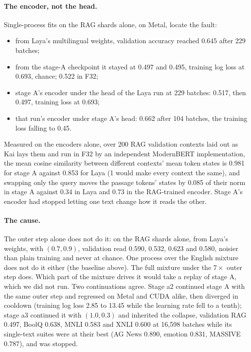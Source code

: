 \paragraph{The encoder, not the head.}
Single-process fits on the RAG shards alone, on Metal, locate the fault:
\begin{itemize}[leftmargin=1.5em]
  \item from Laya's multilingual weights, validation accuracy reached 0.645
    after 229 batches;
  \item from the stage-A checkpoint it stayed at 0.497 and 0.495, training log
    loss at 0.693, chance; 0.522 in F32;
  \item stage A's encoder under the head of the Laya run at 229 batches: 0.517,
    then 0.497, training loss at 0.693;
  \item that run's encoder under stage A's head: 0.662 after 104 batches, the
    training loss falling to 0.45.
\end{itemize}
Measured on the encoders alone, over 200 RAG validation contexts laid out as Kai
lays them and run in F32 by an independent ModernBERT implementation, the mean
cosine similarity between different contexts' mean token states is 0.981 for
stage A against 0.853 for Laya (1 would make every context the same), and
swapping only the query moves the passage tokens' states by 0.085 of their norm
in stage A against 0.34 in Laya and 0.73 in the RAG-trained encoder. Stage A's
encoder had stopped letting one text change how it reads the other.

\paragraph{The cause.}
The outer step alone does not do it: on the RAG shards alone, from Laya's
weights, with $(0.7, 0.9)$, validation read 0.590, 0.532, 0.623 and 0.580,
noisier than plain training and never at chance. One process over the English
mixture does not do it either (the baseline above). The full mixture under the
$7\times$ outer step does. Which part of the mixture drives it would take a
replay of stage A, which we did not run. Two continuations agree. Stage a2
continued stage A with the same outer step and regressed on Metal and CUDA
alike, then diverged in cooldown (training log loss 2.85 to 13.45 while the
learning rate fell to a tenth); stage a3 continued it with $(1.0, 0.3)$ and
inherited the collapse, validation RAG 0.497, BoolQ 0.638, MNLI 0.583 and XNLI
0.600 at 16{,}598 batches while its single-text suites were at their best (AG
News 0.890, emotion 0.831, MASSIVE 0.787), and was stopped.

